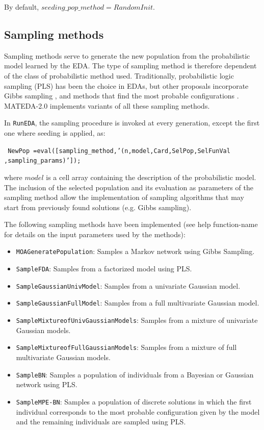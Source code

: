 \documentclass[a4paper]{article}
\begin{document}
By default, $seeding\_pop\_method = RandomInit$.


\subsection{Sampling methods}

 Sampling methods serve to generate the new population from the
 probabilistic model learned by the EDA. The type of sampling method
 is therefore dependent of the class of probabilistic method used.
 Traditionally, probabilistic logic sampling (PLS)
 \cite{Henrion:1988} has been the choice in EDAs, but other
 proposals incorporate Gibbs sampling \cite{Gamez_et_al:2007,Santana:2005,Shakya_and_McCall:2007,Shakya_and_Santana:2008}, and methods that find the most probable
 configurations \cite{Mendiburu_et_al:2007a,Santana:2006,Soto:2003}.
 MATEDA-2.0 implements variants of all these sampling methods.


In  \texttt{RunEDA}, the sampling procedure is invoked at every
generation, except the first one where seeding is applied, as:

\texttt{ NewPop
=eval([sampling\_method,'(n,model,Card,SelPop,SelFunVal \\
,sampling\_params)']); }

where $model$ is a cell array  containing
the description of the probabilistic model. The inclusion of the
selected population and its evaluation as parameters of the sampling
method allow the implementation of sampling algorithms that may
start from previously found solutions (e.g. Gibbs sampling).


The following sampling  methods have been implemented (see help
function-name for details on the  input parameters used by the methods):

\begin{itemize}
  \item \texttt{MOAGeneratePopulation}: Samples a Markov network  using Gibbs
  Sampling.
  \item \texttt{SampleFDA}: Samples  from a factorized model using
  PLS.
  \item \texttt{SampleGaussianUnivModel}: Samples  from a univariate Gaussian
  model.
   \item \texttt{SampleGaussianFullModel}: Samples from a full multivariate Gaussian
  model.
  \item \texttt{SampleMixtureofUnivGaussianModels}:  Samples  from a mixture of univariate Gaussian
  models.
    \item \texttt{SampleMixtureofFullGaussianModels}:  Samples  from a mixture of full multivariate Gaussian
  models.
  \item \texttt{SampleBN}: Samples a  population of individuals from a Bayesian or Gaussian network using PLS.
  \item \texttt{SampleMPE-BN}: Samples a population of discrete solutions in which the first individual corresponds
   to the most probable configuration given by the model and the remaining individuals  are sampled using PLS.
\end{itemize}
\end{document}
